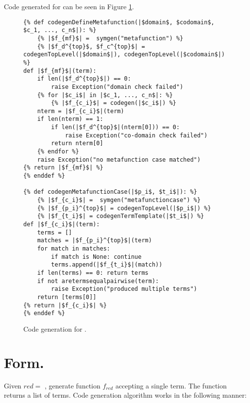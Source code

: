 Code generated for \DefineMetafunctionNoArgs \space can be seen in Figure \ref{codegen-define-metafunc}.
\begin{figure}
\begin{verbatim}
{% def codegenDefineMetafunction(|$domain$, $codomain$, $c_1, ..., c_n$|): %}
	{% |$f_{mf}$| =  symgen("metafunction") %}
	{% |$f_d^{top}$, $f_c^{top}$| = codegenTopLevel(|$domain$|), codegenTopLevel(|$codomain$|) %}
def |$f_{mf}$|(term):
	if len(|$f_d^{top}$|) == 0: 
		raise Exception("domain check failed")
	{% for |$c_i$| in |$c_1, ..., c_n$|: %}
		{% |$f_{c_i}$| = codegen(|$c_i$|) %}
	nterm = |$f_{c_i}$|(term)
	if len(nterm) == 1:
		if len(|$f_d^{top}$|(nterm[0])) == 0:
			raise Exception("co-domain check failed")
		return nterm[0]
	{% endfor %}
	raise Exception("no metafunction case matched")
{% return |$f_{mf}$| %}
{% enddef %}

{% def codegenMetafunctionCase(|$p_i$, $t_i$|): %}
	{% |$f_{c_i}$| =  symgen("metafunctioncase") %}
	{% |$f_{p_i}^{top}$| = codegenTopLevel(|$p_i$|) %}
	{% |$f_{t_i}$| = codegenTermTemplate(|$t_i$|) %}
def |$f_{c_i}$|(term):
	terms = []
	matches = |$f_{p_i}^{top}$|(term)
	for match in matches:
		if match is None: continue
		terms.append(|$f_{t_i}$|(match))
	if len(terms) == 0: return terms 
	if not aretermsequalpairwise(term):
		raise Exception("produced multiple terms")
	return [terms[0]]
{% return |$f_{c_i}$| %}
{% enddef %}
\end{verbatim}
\caption{Code generation for \DefineMetafunctionNoArgs.}
\label{codegen-define-metafunc}
\end{figure}

\section{\DefineReductionRelationNoArgs \space Form.}
Given $red=$ \TlDefineReductionRelation, generate function $f_{red}$ accepting a single term. The function returns a list of terms. Code generation algorithm works in the following manner:

